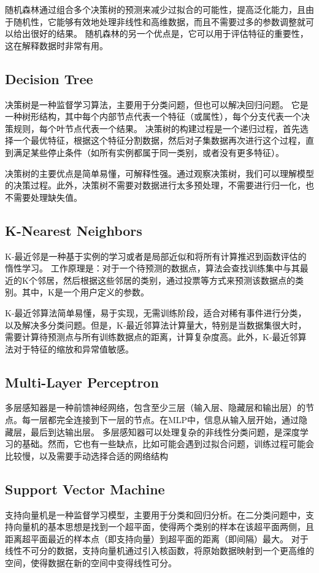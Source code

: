 \documentclass{ctexart}
\begin{document}
	随机森林通过组合多个决策树的预测来减少过拟合的可能性，提高泛化能力，且由于随机性，它能够有效地处理非线性和高维数据，而且不需要过多的参数调整就可以给出很好的结果。
随机森林的另一个优点是，它可以用于评估特征的重要性，这在解释数据时非常有用。


	\subsection{Decision Tree}
	决策树是一种监督学习算法，主要用于分类问题，但也可以解决回归问题。
	它是一种树形结构，其中每个内部节点代表一个特征（或属性），每个分支代表一个决策规则，每个叶节点代表一个结果。
	决策树的构建过程是一个递归过程，首先选择一个最优特征，根据这个特征分割数据，然后对子集数据再次进行这个过程，直到满足某些停止条件（如所有实例都属于同一类别，或者没有更多特征）。

决策树的主要优点是简单易懂，可解释性强。通过观察决策树，我们可以理解模型的决策过程。此外，决策树不需要对数据进行太多预处理，不需要进行归一化，也不需要处理缺失值。


	\subsection{K-Nearest Neighbors}
	K-最近邻是一种基于实例的学习或者是局部近似和将所有计算推迟到函数评估的惰性学习。
工作原理是：对于一个待预测的数据点，算法会查找训练集中与其最近的K个邻居，然后根据这些邻居的类别，通过投票等方式来预测该数据点的类别。其中，K是一个用户定义的参数。

K-最近邻算法简单易懂，易于实现，无需训练阶段，适合对稀有事件进行分类，以及解决多分类问题。但是，K-最近邻算法计算量大，特别是当数据集很大时，需要计算待预测点与所有训练数据点的距离，计算复杂度高。此外，K-最近邻算法对于特征的缩放和异常值敏感。
	\subsection{Multi-Layer Perceptron}
	多层感知器是一种前馈神经网络，包含至少三层（输入层、隐藏层和输出层）的节点。每一层都完全连接到下一层的节点。在MLP中，信息从输入层开始，通过隐藏层，最后到达输出层。
	多层感知器可以处理复杂的非线性分类问题，是深度学习的基础。然而，它也有一些缺点，比如可能会遇到过拟合问题，训练过程可能会比较慢，以及需要手动选择合适的网络结构
	\subsection{Support Vector Machine}
	支持向量机是一种监督学习模型，主要用于分类和回归分析。在二分类问题中，支持向量机的基本思想是找到一个超平面，使得两个类别的样本在该超平面两侧，且距离超平面最近的样本点（即支持向量）到超平面的距离（即间隔）最大。
对于线性不可分的数据，支持向量机通过引入核函数，将原始数据映射到一个更高维的空间，使得数据在新的空间中变得线性可分。
\end{document}

